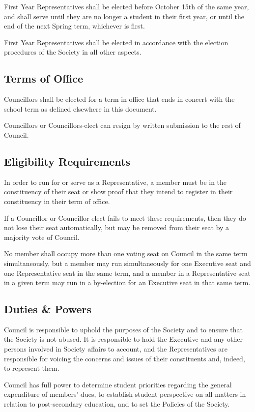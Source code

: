 First Year Representatives shall be elected before October 15th of the same
year, and shall serve until they are no longer a student in their first year,
or until the end of the next Spring term, whichever is first.

First Year Representatives shall be elected in accordance with the election
procedures of the Society in all other aspects.

\subsection{Terms of Office}
Councillors shall be elected for a term in office that ends in concert with the
school term as defined elsewhere in this document.

Councillors or Councillors-elect can resign by written submission to the rest
of Council.

\subsection{Eligibility Requirements}
In order to run for or serve as a Representative, a member must be in the
constituency of their seat or show proof that they intend to register in their
constituency in their term of office.

If a Councillor or Councillor-elect fails to meet these requirements, then they
do not lose their seat automatically, but may be removed from their seat by a
majority vote of Council.

No member shall occupy more than one voting seat on Council in the same term
simultaneously, but a member may run simultaneously for one Executive seat and
one Representative seat in the same term, and a member in a Representative seat
in a given term may run in a by-election for an Executive seat in that same
term.

\subsection{Duties \& Powers}
Council is responsible to uphold the purposes of the Society and to
ensure that the Society is not abused. It is responsible to hold the Executive
and any other persons involved in Society affairs to account, and the
Representatives are responsible for voicing the concerns and issues of their
constituents and, indeed, to represent them. 

Council has full power to determine student priorities regarding the
general expenditure of members’ dues, to establish student perspective on all
matters in relation to post-secondary education, and to set the Policies of the
Society.

